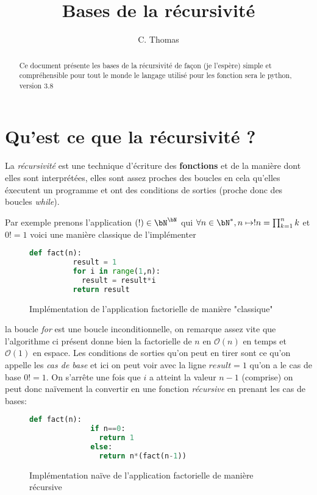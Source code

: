\documentclass[hidelinks]{article}
\title{Bases de la récursivité}
\author{C. Thomas}
\begin{document}
    \maketitle
    \begin{abstract}
        Ce document présente les bases de la récursivité de façon (je l'espère) simple et compréhensible pour tout le monde
        le langage utilisé pour les fonction sera le python, version 3.8
    \end{abstract}
    \tableofcontents
    \listoffigures
    \newpage

    \section{Qu'est ce que la récursivité ?}
    \begin{definition}
        
    La \textit{récursivité} est une technique d'écriture des \textbf{fonctions} et de la manière dont elles sont 
    interprétées, elles sont assez proches des boucles en cela qu'elles éxecutent un programme et ont des conditions de sorties 
    (proche donc des boucles \textit{while}).
\end{definition}
   
    Par exemple prenons l'application $(!) \in \bN^{\bN}$ qui $\forall n \in \bN^*, n \mapsto !n = \prod_{k=1}^{n} k$ et $0! = 1$
    voici une manière classique de l'implémenter 
    \begin{figure}[H]
    \begin{lstlisting}[language=Python]
        def fact(n):
          result = 1
          for i in range(1,n):
            result = result*i
          return result
    \end{lstlisting}
    \caption{Implémentation de l'application factorielle de manière "classique"}
\end{figure}
    la boucle \textit{for} est une boucle inconditionnelle, on remarque assez vite que l'algorithme ci présent donne bien la factorielle 
    de $n$ en $\mathcal{O}(n)$ en temps et $\mathcal{O}(1)$ en espace.
    Les conditions de sorties qu'on peut en tirer sont ce qu'on appelle les \textit{cas de base} et ici on peut voir 
    avec la ligne $result=1$ qu'on a le cas de base $0! = 1$. On s'arrête une fois que $i$ a atteint la valeur $n-1$ (comprise)
    on peut donc naïvement la convertir en une fonction \textit{récursive} en prenant les cas de bases:

    \begin{figure}[H]
        \begin{lstlisting}[language=Python]
            def fact(n):
              if n==0:
                return 1
              else:
                return n*(fact(n-1))
        \end{lstlisting}
        \caption{Implémentation naïve de l'application factorielle de manière récursive}
    \end{figure}
\end{document}
